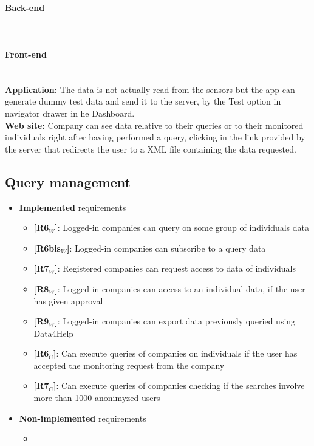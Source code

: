 \paragraph{Back-end} \mbox{}\\  
\paragraph{Front-end} \mbox{}\\
\textbf{Application:} The data is not actually read from the sensors but the app can generate dummy test data and send it to the server, by the Test option in navigator drawer in he Dashboard.\\
\textbf{Web site: }Company can see data relative to their queries or to their monitored individuals right after having performed a query, clicking in the link provided by the server that redirects the user to a XML file containing the data requested.


\subsection{Query management}
\begin{itemize}
    \item \textbf{Implemented} requirements
        \begin{itemize}
    \item \textbf{[R6$_W$]}: Logged-in companies can query on some group of individuals data
    \item \textbf{[R6bis$_W$]}: Logged-in companies can subscribe to a query data
    \item \textbf{[R7$_W$]}: Registered companies can request access to data of individuals
    \item \textbf{[R8$_W$]}: Logged-in companies can access to an individual data, if the user has given approval
    \item \textbf{[R9$_W$]}: Logged-in companies can export data previously queried using Data4Help

    \item \textbf{[R6$_C$]}: Can execute queries of companies on individuals if the user has accepted the monitoring request from the company
    \item \textbf{[R7$_C$]}: Can execute queries of companies checking if the searches involve more than 1000 anonimyzed users 

        \end{itemize}
    \item \textbf{Non-implemented} requirements
    \begin{itemize}
            \item 
        \end{itemize}
\end{itemize}

